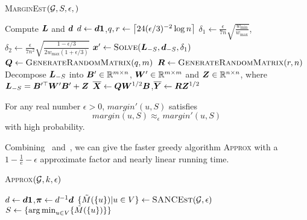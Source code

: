 \documentclass[sigconf]{acmart}
\begin{document}
\begin{algorithm}
    \caption{\textsc{MarginEst}\((\mathcal{G},S,\epsilon,)\)}
    \label{algo:marginest}
    Compute \(\boldsymbol{L}\) and \(\boldsymbol{d}\)\;
    \(d\gets\boldsymbol{d}\boldsymbol{1}\),\(q,r\gets\left\lceil24(\epsilon/3)^{-2}\log n\right\rceil\)\;
    \(\delta_1\gets \frac{\epsilon}{7n}\sqrt{\frac{w_{\min}}{w_{\max}}}\),\(\delta_2\gets \frac{\epsilon}{7n^2}\sqrt{\frac{1-\epsilon/3}{2w_{\max}(1+\epsilon/3)}}\)\;
    \(\boldsymbol{x}'\gets\textsc{Solve}(\boldsymbol{L}_{-S},\boldsymbol{d}_{-S},\delta_1)\)\;
    \(\boldsymbol{Q}\gets\textsc{GenerateRandomMatrix}(q,m)\)\;
    \(\boldsymbol{R}\gets\textsc{GenerateRandomMatrix}(r,n)\)\;
    Decompose \(\boldsymbol{L}_{-S}\) into \(\boldsymbol{B}'\in\mathbb{R}^{m\times n}\), \(\boldsymbol{W}'\in\mathbb{R}^{m\times m}\) and \(\boldsymbol{Z}\in\mathbb{R}^{n\times n}\), where \(\boldsymbol{L}_{-S}=\boldsymbol{B}'^\top\boldsymbol{W}'\boldsymbol{B}'+\boldsymbol{Z}\)\;
    \(\overline{\boldsymbol{X}}\gets\boldsymbol{Q}\boldsymbol{W}^{1/2}\boldsymbol{B}\),\(\overline{\boldsymbol{Y}}\gets\boldsymbol{R}\boldsymbol{Z}^{1/2}\)\;

\end{algorithm}

\begin{theorem}\label{thm:approx-marginest}
    For any real number \(\epsilon>0\), \(margin'(u,S)\) satisfies
    \[margin(u,S)\approx_\epsilon margin'(u,S)\]
    with high probability.
\end{theorem}


Combining~ and~, we can give the faster greedy algorithm \textsc{Approx} with a \(1-\frac1e-\epsilon\) approximate factor and nearly linear running time.

\begin{algorithm}
    \caption{\textsc{Approx}\((\mathcal{G},k,\epsilon)\)}
    \label{algo:approx}
    \(d\gets\boldsymbol{d}\boldsymbol{1}\),\(\boldsymbol{\pi}\gets d^{-1}\boldsymbol{d}\)\;
    \(\{\tilde{M}(\{u\})|u\in V \}\gets\textsc{SANCEst}(\mathcal{G},\epsilon)\)\;
    \(S\gets\{\operatorname*{arg\,min}_{u\in V}\{\tilde{M}(\{u\}) \} \}\)\;
\end{algorithm}
\end{document}
